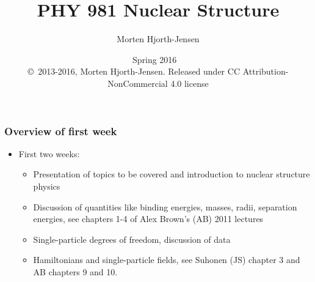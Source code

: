 \documentclass{beamer}
\begin{document}







\title{PHY 981 Nuclear Structure}


\author{Morten Hjorth-Jensen}

\date{Spring 2016 
\ \\ 
{\tiny \copyright\ 2013-2016, Morten Hjorth-Jensen. Released under CC Attribution-NonCommercial 4.0 license}
}

\begin{frame}
\titlepage
\end{frame}

\begin{frame}
\frametitle{Overview of first week}

\begin{block}{}

\begin{itemize}
\item First two weeks:
\begin{itemize}

 \item Presentation of topics to be covered and introduction to nuclear structure physics

 \item Discussion of quantities like binding energies, masses, radii, separation energies, see chapters 1-4 of Alex Brown's (AB) 2011 lectures

 \item Single-particle degrees of freedom, discussion of data

 \item Hamiltonians and single-particle fields, see  Suhonen (JS) chapter 3  and AB chapters 9 and 10.
\end{itemize}

\noindent
\end{itemize}

\noindent
\end{block}
\end{frame}
\end{document}
